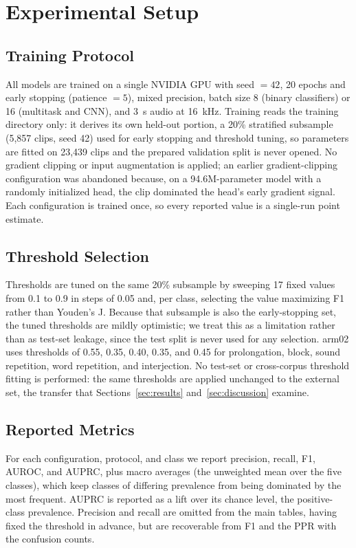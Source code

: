 \documentclass[a4paper,orivec]{llncs}
\begin{document}
\section{Experimental Setup}
\label{sec:setup}

\subsection{Training Protocol}
All models are trained on a single NVIDIA GPU with seed $= 42$, 20 epochs and
early stopping (patience $= 5$), mixed precision, batch size 8 (binary
classifiers) or 16 (multitask and CNN), and 3~s audio at 16~kHz. Training reads
the training directory only: it derives its own held-out portion, a 20\%
stratified subsample (5{,}857 clips, seed 42) used for early stopping and
threshold tuning, so parameters are fitted on 23{,}439 clips and the prepared
validation split is never opened. No gradient clipping or input augmentation is
applied; an earlier gradient-clipping configuration was abandoned because, on a
94.6M-parameter model with a randomly initialized head, the clip dominated the
head's early gradient signal. Each configuration is trained once, so every
reported value is a single-run point estimate.

\subsection{Threshold Selection}
Thresholds are tuned on the same 20\% subsample by sweeping 17 fixed values from
0.1 to 0.9 in steps of 0.05 and, per class, selecting the value maximizing F1
rather than Youden's J. Because that subsample is also the early-stopping set,
the tuned thresholds are mildly optimistic; we treat this as a limitation rather
than as test-set leakage, since the test split is never used for any selection.
arm02 uses thresholds of 0.55, 0.35, 0.40, 0.35, and 0.45 for
prolongation, block, sound repetition, word repetition, and interjection. No
test-set or cross-corpus threshold fitting is performed: the same thresholds are
applied unchanged to the external set, the transfer that
Sections~\ref{sec:results} and~\ref{sec:discussion} examine.

\subsection{Reported Metrics}
\label{sec:metrics}
For each configuration, protocol, and class we report precision, recall, F1,
AUROC, and AUPRC, plus macro averages (the unweighted mean over the five classes),
which keep classes of differing prevalence from being dominated by the most
frequent. AUPRC is reported as a lift over its chance level, the positive-class
prevalence. Precision and recall are omitted from the main tables, having fixed
the threshold in advance, but are recoverable from F1 and the PPR with the
confusion counts.
\end{document}
